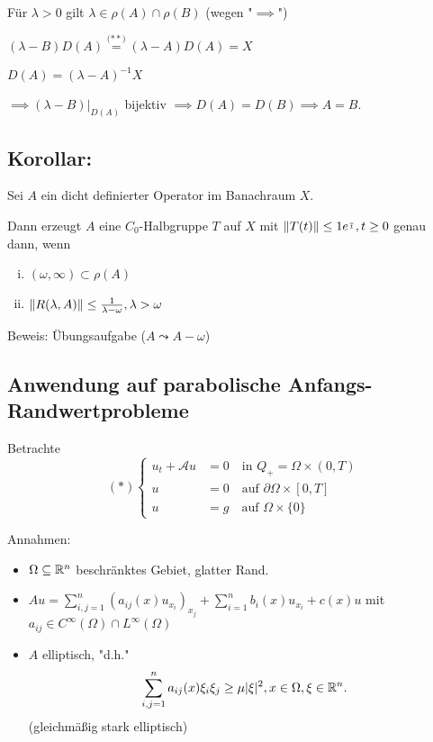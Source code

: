 Für $\lambda > 0$ gilt $\lambda \in \rho(A) \cap \rho(B)$ (wegen "$\implies$")

$(\lambda - B)D(A) \overset{\text{($\ast\ast$)}}{=} (\lambda - A) D(A) = X$

{\tiny{$D(A) = (\lambda - A)^{-1} X$}}

$\implies (\lambda - B)|_{D(A)}$ bijektiv $\implies D(A) = D(B) \implies A = B$.

\subsection{Korollar:}

Sei $A$ ein dicht definierter Operator im Banachraum $X$.

Dann erzeugt $A$ eine $C_0$-Halbgruppe $T$ auf $X$ mit $\lVert T(t) \rVert \leq 1 e^{\over t}, t \geq 0$ genau dann, wenn
\begin{enumerate}[i)]
  \item $(\omega, \infty) \subset \rho(A)$
  \item $\lVert R(\lambda, A) \rVert \leq \frac{1}{\lambda - \omega}, \lambda > \omega$ 
\end{enumerate}

Beweis: Übungsaufgabe ($A \leadsto A - \omega$)

\subsection{Anwendung auf parabolische Anfangs-Randwertprobleme}

Betrachte 
$$
(\ast)
\begin{cases}
u_t + \mathcal{A} u &= 0 \quad\text{in } Q_+ = \Omega \times (0,T) \\
u &= 0 \quad\text{auf } \partial\Omega \times [0,T]\\
u &= g \quad\text{auf } \Omega \times \{0\}
\end{cases}
$$

Annahmen: 
\begin{itemize}
  \item $\Omega \subseteq \mathbb{R}^n$ beschränktes Gebiet, glatter Rand.
  \item $A u = \sum_{i,j = 1}^n (a_{ij}(x) u_{x_i})_{x_j} + \sum_{i = 1}^n b_i(x) u_{x_i} + c(x) u$ mit $a_{ij} \in C^\infty(\Omega) \cap L^\infty(\Omega)$
  \item $A$ elliptisch, "d.h."
  $$
  \sum_{i, j = 1}^n a_{ij}(x) \xi_i \xi_j \geq \mu|\xi|^2, x \in \Omega, \xi \in \mathbb{R}^n.
  $$ 
  (gleichmäßig stark elliptisch)
\end{itemize}

